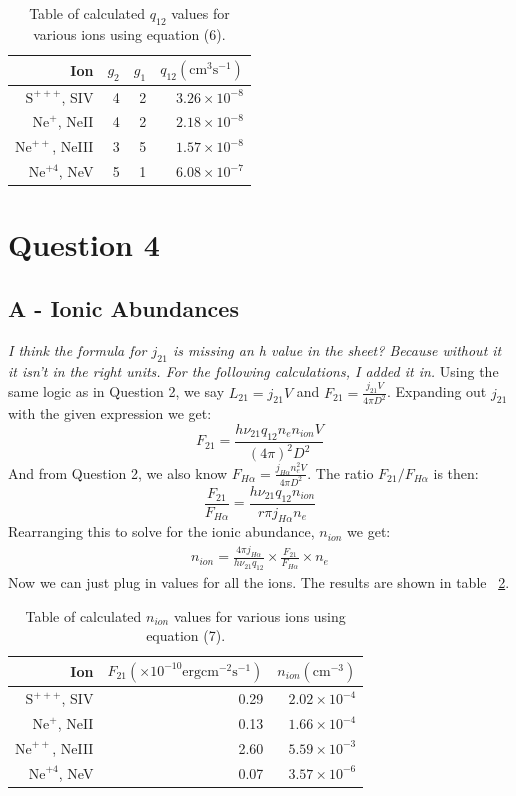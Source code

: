 \documentclass{article}
\begin{document}
\begin{table}[h!]
\centering
\begin{tabular}{r r r r}
\hline
Ion & $g_2$ & $g_1$ & $q_{12} (\mathrm{cm}^3 \mathrm{s}^{-1})$ \\
\hline
$\mathrm {S}^{+++}$, SIV &  4 & 2 & $3.26 \times 10^{-8}$ \\
$\mathrm {Ne}^{+}$, NeII & 4 & 2 & $2.18 \times 10^{-8}$ \\
$\mathrm {Ne}^{++}$, NeIII & 3 & 5 & $1.57 \times 10^{-8}$ \\
$\mathrm {Ne}^{+4}$, NeV & 5 & 1 & $6.08 \times 10^{-7}$ \\
\hline
\end{tabular}
\captionsetup{position=bottom}
\caption{Table of calculated $q_{12}$ values for various ions using equation (6).}
\label{tab:q3}
\end{table}

\section{Question 4}
\subsection{A - Ionic Abundances}
\textit{I think the formula for $j_{21}$ is missing an h value in the sheet? Because without it it isn't in the right units. For the following calculations, I added it in.}
Using the same logic as in Question 2, we say $L_{21} = j_{21} V$ and $F_{21} = \frac{j_{21} V}{4 \pi D^2}$. Expanding out $j_{21}$ with the given expression we get: 
\[
F_{21} = \frac{h \nu_{21} q_{12}n_e n_{ion} V}{(4 \pi)^2 D^2}
\]
And from Question 2, we also know $F_{H\alpha} = \frac{j_{H\alpha} n_e^2 V}{4 \pi D^2}$. The ratio $F_{21}/F_{H\alpha}$ is then:
\[
\frac{F_{21}}{F_{H\alpha}} = \frac{h \nu_{21} q_{12} n_{ion}}{r\pi j_{H\alpha} n_e}
\]
Rearranging this to solve for the ionic abundance, $n_{ion}$ we get:
\begin{align}
n_{ion} = \frac{4 \pi j_{H\alpha}}{h\nu_{21} q_{12}} \times \frac{F_{21}}{F_{H\alpha}} \times n_e
\end{align}
Now we can just plug in values for all the ions. The results are shown in table ~\ref{tab:q4a}.

\begin{table}[h!]
\centering
\begin{tabular}{r r r }
\hline
Ion & $F_{21} (\times10^{-10} \mathrm{erg} \mathrm{cm}^{-2} \mathrm{s}^{-1})$ & $n_{ion} (\mathrm{cm}^{-3})$ \\
\hline
$\mathrm {S}^{+++}$, SIV &  0.29 & $2.02 \times 10^{-4}$ \\
$\mathrm {Ne}^{+}$, NeII & 0.13 & $1.66 \times10^{-4}$ \\
$\mathrm {Ne}^{++}$, NeIII & 2.60 & $5.59 \times10^{-3}$ \\
$\mathrm {Ne}^{+4}$, NeV & 0.07 & $3.57 \times10^{-6}$ \\
\hline
\end{tabular}
\captionsetup{position=bottom}
\caption{Table of calculated $n_{ion}$ values for various ions using equation (7).}
\label{tab:q4a}
\end{table}
\end{document}
